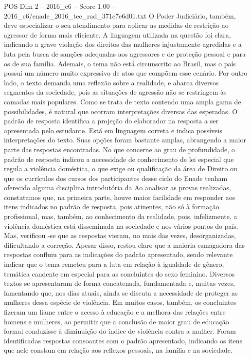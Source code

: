 \begin{textsample}{POS Dim 2 – 2016\_c6 – Score 1.00 – 2016\_c6/enade\_2016\_tec\_rad\_371c7e6d01.txt}
O Poder Judiciário, também, deve especializar o seu atendimento para aplicar as medidas de restrição ao agressor de forma mais eficiente.
A linguagem utilizada na questão foi clara, indicando a grave violação dos direitos das mulheres injustamente agredidas e a luta pela busca de sanções adequadas aos agressores e de proteção pessoal e para os de sua família.
Ademais, o tema não está circunscrito ao Brasil, mas o país possui um número muito expressivo de atos que compõem esse cenário.
Por outro lado, o texto demanda uma reflexão sobre a realidade, e abarca diversos segmentos da sociedade, pois as situações de agressão não se restringem às camadas mais populares.
Como se trata de texto contendo uma ampla gama de possibilidades, é natural que ocorram interpretações diversas das esperadas.
O padrão de resposta identifica a projeção do elaborador na resposta a ser apresentada pelo estudante.
Está em linguagem correta e indica possíveis interpretações do texto.
Suas opções foram bastante amplas, abrangendo a maior parte das respostas encontradas.
No que concerne ao grau de profundidade, o padrão de resposta indicou a necessidade de conhecimento de lei especial que regula a violência doméstica, o que exige ou qualificação da área de Direito ou que os currículos dos cursos dos participantes desse ciclo do Enade tenham oferecido alguma disciplina introdutória da Ao analisar as provas realizadas, constatamos que, na primeira parte, houve maior facilidade em responder aos itens indicados no padrão de resposta, pois atinentes, não só à formação profissional, mas, também, ao conhecimento da realidade, pois, infelizmente, a violência doméstica está disseminada na sociedade e nos vários pontos do país.
Mas, verificou -se que as respostas vieram, no mais das vezes, desorganizadas, dificultando a correção.
Apesar disso, restou claro que a maioria esmagadora das respostas confluiu para as indicações do padrão apresentado, sendo relevante indicar que o tema remeteu para a luta em relação à igualdade de gênero, temática candente em especial para as concluintes do sexo feminino.
Diversos textos se apresentaram de forma concatenada, fundamentada e, muitas vezes, lamentando que, nos dias atuais, ainda se discuta a necessidade de proteger as mulheres dessa espécie de violência.
Em muitos casos, também, os concluintes fizeram um liame entre o acesso à educação e a melhora das relações entre homens e mulheres, ao permitir que a conclusão de maior grau de educação formal conduzisse à diminuição do índice de violência contra a mulher.
Foram identificadas respostas consoantes com o padrão apresentado, indicando os itens que nele constam em relação aos reflexos pessoais, na família e na sociedade.

\end{textsample}
